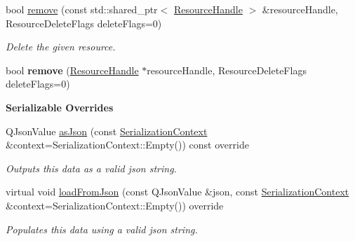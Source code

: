 \begin{Indent}
\begin{DoxyCompactItemize}
\mbox{\label{classrev_1_1_resource_cache_a7c10e4c0ec08c45c7561b40a284c9b24}} 
bool \mbox{\hyperlink{classrev_1_1_resource_cache_a7c10e4c0ec08c45c7561b40a284c9b24}{remove}} (const std\+::shared\+\_\+ptr$<$ \mbox{\hyperlink{classrev_1_1_resource_handle}{Resource\+Handle}} $>$ \&resource\+Handle, Resource\+Delete\+Flags delete\+Flags=0)
\begin{DoxyCompactList}\small\item\em Delete the given resource. \end{DoxyCompactList}\item 
\mbox{\label{classrev_1_1_resource_cache_ac93222a125af7450bd2745753864785f}} 
bool {\bfseries remove} (\mbox{\hyperlink{classrev_1_1_resource_handle}{Resource\+Handle}} $\ast$resource\+Handle, Resource\+Delete\+Flags delete\+Flags=0)
\end{DoxyCompactItemize}
\end{Indent}
\begin{Indent}\textbf{ Serializable Overrides}\par
\begin{DoxyCompactItemize}
\item 
\mbox{\label{classrev_1_1_resource_cache_a95ae2d3e5a5d0d47d8eff2ebd1109b3c}} 
Q\+Json\+Value \mbox{\hyperlink{classrev_1_1_resource_cache_a95ae2d3e5a5d0d47d8eff2ebd1109b3c}{as\+Json}} (const \mbox{\hyperlink{structrev_1_1_serialization_context}{Serialization\+Context}} \&context=Serialization\+Context\+::\+Empty()) const override
\begin{DoxyCompactList}\small\item\em Outputs this data as a valid json string. \end{DoxyCompactList}\item 
\mbox{\label{classrev_1_1_resource_cache_a56a55526f1d5282731cca2781d37d073}} 
virtual void \mbox{\hyperlink{classrev_1_1_resource_cache_a56a55526f1d5282731cca2781d37d073}{load\+From\+Json}} (const Q\+Json\+Value \&json, const \mbox{\hyperlink{structrev_1_1_serialization_context}{Serialization\+Context}} \&context=Serialization\+Context\+::\+Empty()) override
\begin{DoxyCompactList}\small\item\em Populates this data using a valid json string. \end{DoxyCompactList}\end{DoxyCompactItemize}
\end{Indent}

